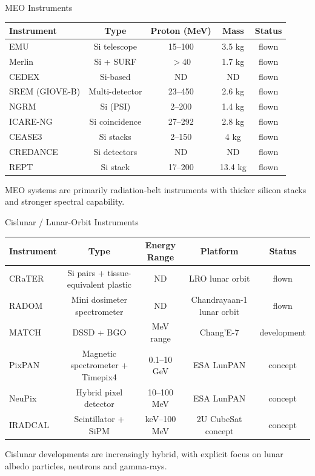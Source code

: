 \documentclass[aspectratio=169]{beamer}
\newcommand{\newi}[1]{\textcolor{newinst}{#1}}
\begin{document}
\begin{frame}{MEO Instruments}
\scriptsize
\begin{tabular}{lcccc}
\toprule
Instrument & Type & Proton (MeV) & Mass & Status \\
\midrule
EMU & Si telescope & 15--100 & 3.5 kg & flown \\
\newi{Merlin} & Si + SURF & $>$40 & 1.7 kg & flown \\
\newi{CEDEX} & Si-based & ND & ND & flown \\
\newi{SREM (GIOVE-B)} & Multi-detector & 23--450 & 2.6 kg & flown \\
NGRM & Si (PSI) & 2--200 & 1.4 kg & flown \\
\newi{ICARE-NG} & Si coincidence & 27--292 & 2.8 kg & flown \\
CEASE3 & Si stacks & 2--150 & 4 kg & flown \\
\newi{CREDANCE} & Si detectors & ND & ND & flown \\
\newi{REPT} & Si stack & 17--200 & 13.4 kg & flown \\
\bottomrule
\end{tabular}

\vspace{0.3cm}
\footnotesize
MEO systems are primarily radiation-belt instruments with thicker silicon stacks and stronger spectral capability.
\end{frame}

\begin{frame}{Cislunar / Lunar-Orbit Instruments}
\scriptsize
\begin{tabular}{lcccc}
\toprule
Instrument & Type & Energy Range & Platform & Status \\
\midrule
\newi{CRaTER} & Si pairs + tissue-equivalent plastic & ND & LRO lunar orbit & flown \\
\newi{RADOM} & Mini dosimeter spectrometer & ND & Chandrayaan-1 lunar orbit & flown \\
\newi{MATCH} & DSSD + BGO & MeV range & Chang'E-7 & development \\
\newi{PixPAN} & Magnetic spectrometer + Timepix4 & 0.1--10 GeV & ESA LunPAN & concept \\
\newi{NeuPix} & Hybrid pixel detector & 10--100 MeV & ESA LunPAN & concept \\
\newi{IRADCAL} & Scintillator + SiPM & keV--100 MeV & 2U CubeSat concept & concept \\
\bottomrule
\end{tabular}

\vspace{0.3cm}
\footnotesize
Cislunar developments are increasingly hybrid, with explicit focus on lunar albedo particles, neutrons and gamma-rays.
\end{frame}
\end{document}
